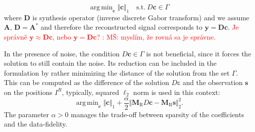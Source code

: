 \documentclass[conference]{IEEEtran}
\newcommand{\todo}[1]{\textcolor{red}{#1}}
\begin{document}
\begin{equation}
	\label{eq:synthesis.gamma}
	\mathop {\operatorname{arg \, min}}_\mathbf {c}\Vert \mathbf {c}\Vert _1 \quad \text{s.t.}\ D\mathbf {c}\in \Gamma
\end{equation} 
where $\mathbf{D} $ is synthesis operator (inverse discrete Gabor transform) and we assume $ \mathbf{A} $, $ \mathbf{D} = \mathbf{A}^* $ and therefore the reconstructed signal corresponds to $ \mathbf {y} =  \mathbf{D}\mathbf {c}$.
\todo{Je správně $ \mathbf {y} \approx \mathbf{D}\mathbf {c}$, nebo $ \mathbf {y} =  \mathbf{D}\mathbf {c}$? : MŠ: myslím, že rovná sa je správne.}


%
%		

In the presence of noise, the condition $D\mathbf {c}\in \Gamma$ is not beneficial, since it forces the solution to still contain the noise.
Its reduction can be included in the formulation by rather minimizing the distance of the solution from the set $\Gamma$.
This can be computed as the difference of the solution $D\mathbb{c}$ and the observation $\mathbf{s}$  on the positions $I^R$, typically, squared $\ell_2$ norm is used in this context:
\begin{equation}
	\label{eq:synthesis.dist}
	\mathop {\operatorname{arg \, min}}_\mathbf {c}\Vert \mathbf {c}\Vert _1 + \frac{\alpha}{2} \Vert \mathbf{M}_{\mathrm{R}} D\mathbf {c} - \mathbf{M}_{\mathrm{R}} \mathbf{s} \Vert^2_2.
\end{equation} 
The parameter $\alpha > 0$ manages the trade-off between sparsity of the coefficients and the data-fidelity.
\end{document}

